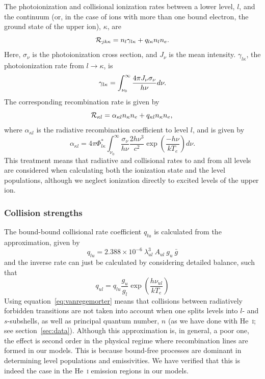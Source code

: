 The photoionization and collisional ionization rates
between a lower level, $l$, and the continuum (or, in the case of ions
with more than one bound electron, the ground state of the upper ion),
$\kappa$, are
\begin{equation}
{\cal R}_{jk \kappa}= n_l \gamma_{l\kappa} + q_{l \kappa} n_l n_e.
\end{equation}
Here, $\sigma_{\nu}$ is the photoionization cross section, and $J_{\nu}$
is the mean intensity. $\gamma_{l\kappa}$, the photoionization rate
from $l \rightarrow \kappa$, is
\begin{equation}
\gamma_{l\kappa} = \int_{\nu_0}^{\infty} \frac{ 4 \pi J_{\nu}
  \sigma_{\nu}}{h \nu} d\nu. \\
\end{equation}
The corresponding recombination rate is given by 
\begin{equation}
{\cal R}_{\kappa l} = \alpha_{\kappa l} n_{\kappa} n_e + q_{\kappa l}
n_\kappa n_e, \\
\end{equation}
where $\alpha_{\kappa l}$ is the radiative recombination coefficient
to level $l$, and is given by 
\begin{equation}
\alpha_{\kappa l} = 4\pi \Phi^*_{l\kappa} \int^\infty_{\nu_0} 
\frac{\sigma_\nu}{h \nu} \frac{2 h \nu^3}{c^2} 
\exp \left( \frac{- h \nu}{k T_e} \right) d\nu.
\end{equation}
This treatment means that radiative and collisional
rates to and from all levels are considered when calculating both the
ionization state and the level populations, although we neglect 
ionization directly to excited levels of the upper ion. 

\subsubsection{Collision strengths}
\label{sec:coll}

The bound-bound collisional rate coefficient $q_{lu}$ is calculated from the
\cite{vanregemorter} approximation, given by
\begin{equation}
q_{lu} = 2.388 \times 10^{-6}~\lambda_{ul}^3~A_{ul}~g_u~\bar{g}
\label{eq:vanregemorter}
\end{equation}
and the inverse rate can just be calculated by considering detailed balance, 
such that
\begin{equation}
q_{ul} = q_{lu} \frac{g_u}{g_l} \exp \left( \frac{h \nu_{ul}}{k T_e} \right)
\label{eq:vanregemorterw}
\end{equation}
Using equation~\ref{eq:vanregemorter} means that collisions between radiatively
forbidden transitions are not taken into account when one 
splits levels into $l$- and $s$-subshells, as well
as principal quantum number, $n$ (as we have done with He~\textsc{i}; 
see section~\ref{sec:data}). Although this approximation is, in general, 
a poor one, the effect is second order in the physical 
regime where recombination lines are formed in our models. 
This is because bound-free processes are dominant in determining 
level populations and emissivities. We have verified that this 
is indeed the case in the He~\textsc{i} emission regions in our models.

